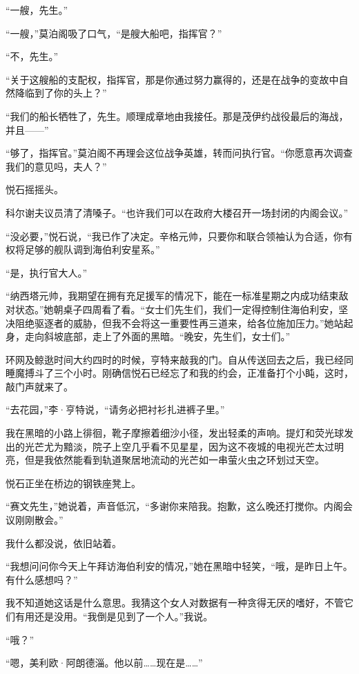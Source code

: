 \documentclass[AutoFakeBold=true]{book}
\begin{document}
``一艘，先生。''

``一艘，''莫泊阁吸了口气，``是艘大船吧，指挥官？''

``不，先生。''

``关于这艘船的支配权，指挥官，那是你通过努力赢得的，还是在战争的变故中自然降临到了你的头上？''

``我们的船长牺牲了，先生。顺理成章地由我接任。那是茂伊约战役最后的海战，并且——''

``够了，{\kaishu 指挥官}。''莫泊阁不再理会这位战争英雄，转而问执行官。``你愿意再次调查我们的意见吗，夫人？''

悦石摇摇头。

科尔谢夫议员清了清嗓子。``也许我们可以在政府大楼召开一场封闭的内阁会议。''

``没必要，''悦石说，``我已作了决定。辛格元帅，只要你和联合领袖认为合适，你有权将足够的舰队调到海伯利安星系。''

``是，执行官大人。''

``纳西塔元帅，我期望在拥有充足援军的情况下，能在一标准星期之内成功结束敌对状态。''她朝桌子四周看了看。``女士们先生们，我们一定得控制住海伯利安，坚决阻绝驱逐者的威胁，但我不会将这一重要性再三道来，给各位施加压力。''她站起身，走向斜坡底部，走上了外面的黑暗。``晚安，先生们，女士们。''

\vspace*{1em}

环网及鲸逖时间大约四时的时候，亨特来敲我的门。自从传送回去之后，我已经同睡魔搏斗了三个小时。刚确信悦石已经忘了和我的约会，正准备打个小盹，这时，敲门声就来了。

``去花园，''李·亨特说，``请务必把衬衫扎进裤子里。''

我在黑暗的小路上徘徊，靴子摩擦着细沙小径，发出轻柔的声响。提灯和荧光球发出的光芒尤为黯淡，院子上空几乎看不见星星，因为这不夜城的电视光芒太过明亮，但是我依然能看到轨道聚居地流动的光芒如一串萤火虫之环划过天空。

悦石正坐在桥边的钢铁座凳上。

``赛文先生，''她说着，声音低沉，``多谢你来陪我。抱歉，这么晚还打搅你。内阁会议刚刚散会。''

我什么都没说，依旧站着。

``我想问问你今天上午拜访海伯利安的情况，''她在黑暗中轻笑，``哦，是昨日上午。有什么感想吗？''

我不知道她这话是什么意思。我猜这个女人对数据有一种贪得无厌的嗜好，不管它们有用还是没用。``我倒是见到了一个人。''我说。

``哦？''

``嗯，美利欧·阿朗德淄。他以前……现在是……''
\end{document}
